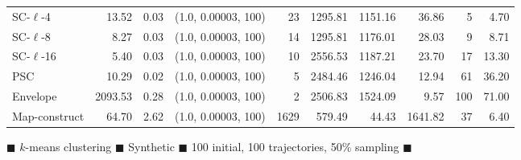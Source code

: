 \begin{figure}
\begin{center}
\begin{minipage}{\textwidth}
{\begin{tabular}{@{}lrrrrrrrrr@{}}
SC-$\ell$-4 & 13.52 & 0.03 & (1.0, 0.00003, 100) & 23 & 1295.81 & 1151.16 & 36.86 & 5 & 4.70\\
SC-$\ell$-8 & 8.27 & 0.03 & (1.0, 0.00003, 100) & 14 & 1295.81 & 1176.01 & 28.03 & 9 & 8.71\\
SC-$\ell$-16 & 5.40 & 0.03 & (1.0, 0.00003, 100) & 10 & 2556.53 & 1187.21 & 23.70 & 17 & 13.30\\
PSC & 10.29 & 0.02 & (1.0, 0.00003, 100) & 5 & 2484.46 & 1246.04 & 12.94 & 61 & 36.20\\
Envelope & 2093.53 & 0.28 & (1.0, 0.00003, 100) & 2 & 2506.83 & 1524.09 & 9.57 & 100 & 71.00\\
Map-construct & 64.70 & 2.62 & (1.0, 0.00003, 100) & 1629 & 579.49 & 44.43 & 1641.82 & 37 & 6.40\\
        \bottomrule
    \end{tabular}
    }
  \end{minipage}
  \end{center}
        \caption{
        $\blacksquare$ $k$-means clustering $\blacksquare$ Synthetic $\blacksquare$ 100 initial, 100 trajectories, 50\% sampling $\blacksquare$}
%
    \end{figure}
\clearpage
\newpage 
%
\clearpage
%
